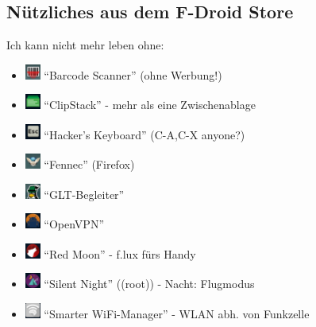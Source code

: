 \documentclass{beamer}
\begin{document}
\subsection{Nützliches aus dem F-Droid Store}

\begin{frame}{Ich kann nicht mehr leben ohne:}

\begin{itemize}
  \item \includegraphics[width=0.5cm]{bar.png} "`Barcode Scanner"' (ohne Werbung!) 
  \item \includegraphics[width=0.5cm]{clip.png} "`ClipStack"' - mehr als eine Zwischenablage  
  \item \includegraphics[width=0.5cm]{keyb.png} "`Hacker's Keyboard"' (C-A,C-X anyone?) 
  \item \includegraphics[width=0.5cm]{fennec.png} "`Fennec"' (Firefox)
  \item \includegraphics[width=0.5cm]{tux.png} "`GLT-Begleiter"'
  \item \includegraphics[width=0.5cm]{ovpn.png} "`OpenVPN"'
  \item \includegraphics[width=0.5cm]{red.png} "`Red Moon"' - f.lux fürs Handy
  \item \includegraphics[width=0.5cm]{night.png} "`Silent Night"' ((root)) - Nacht: Flugmodus
  \item \includegraphics[width=0.5cm]{wifi.png} "`Smarter WiFi-Manager"' - WLAN abh. von Funkzelle
\end{itemize}

\end{frame}
\end{document}
